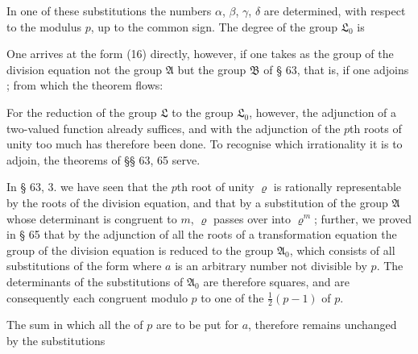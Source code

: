 In one of these substitutions the numbers $\alpha$, $\beta$, $\gamma$, $\delta$ are determined, with respect to the modulus $p$, up to the common sign. The degree of the group $\mathfrak{L}_0$ is

One arrives at the form (16) directly, however, if one takes as the group of the division equation not the group $\mathfrak{A}$ but the group $\mathfrak{B}$ of § 63, that is, if one adjoins ; from which the theorem flows:


For the reduction of the group $\mathfrak{L}$ to the group $\mathfrak{L}_0$, however, the adjunction of a two-valued function already suffices, and with the adjunction of the $p$th roots of unity too much has therefore been done. To recognise which irrationality it is  to adjoin, the theorems of §§ 63, 65 serve.

In § 63, 3. we have seen that the $p$th root of unity $\varrho$ is rationally representable by the roots of the division equation, and that by a substitution of the group $\mathfrak{A}$ whose determinant is congruent to $m$, $\varrho$ passes over into $\varrho^m$; further, we proved in § 65 that by the adjunction of all the roots of a transformation equation the group of the division equation is reduced to the group $\mathfrak{A}_0$, which consists of all substitutions of the form
where $a$ is an arbitrary number not divisible by $p$. The determinants of the substitutions of $\mathfrak{A}_0$ are therefore squares, and are consequently each congruent modulo $p$ to one of the $\frac{1}{2}(p-1)$  of $p$.

The sum
in which all the  of $p$ are to be put for $a$, therefore remains unchanged by the substitutions
